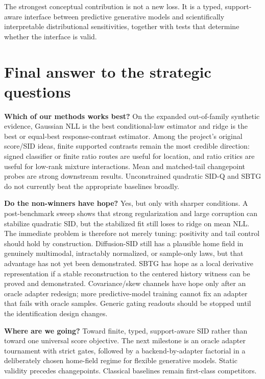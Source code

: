 \documentclass[10pt]{article}
\newcommand{\SIDQ}{\textnormal{\textsc{SID-Q}}\xspace}
\begin{document}
The strongest conceptual contribution is not a new loss. It is a typed, support-aware interface between predictive generative models and scientifically interpretable distributional sensitivities, together with tests that determine whether the interface is valid.



\section{Final answer to the strategic questions}

\textbf{Which of our methods works best?} On the expanded out-of-family synthetic evidence, Gaussian NLL is the best conditional-law estimator and ridge is the best or equal-best response-contrast estimator. Among the project's original score/SID ideas, finite supported contrasts remain the most credible direction: signed classifier or finite ratio routes are useful for location, and ratio critics are useful for low-rank mixture interactions. Mean and matched-tail changepoint probes are strong downstream results. Unconstrained quadratic \SIDQ and SBTG do not currently beat the appropriate baselines broadly.

\textbf{Do the non-winners have hope?} Yes, but only with sharper conditions. A post-benchmark sweep shows that strong regularization and large corruption can stabilize quadratic SID, but the stabilized fit still loses to ridge on mean NLL. The immediate problem is therefore not merely tuning: positivity and tail control should hold by construction. Diffusion-SID still has a plausible home field in genuinely multimodal, intractably normalized, or sample-only laws, but that advantage has not yet been demonstrated. SBTG has hope as a local derivative representation if a stable reconstruction to the centered history witness can be proved and demonstrated. Covariance/skew channels have hope only after an oracle adapter redesign; more predictive-model training cannot fix an adapter that fails with oracle samples. Generic gating readouts should be stopped until the identification design changes.

\textbf{Where are we going?} Toward finite, typed, support-aware SID rather than toward one universal score objective. The next milestone is an oracle adapter tournament with strict gates, followed by a backend-by-adapter factorial in a deliberately chosen home-field regime for flexible generative models. Static validity precedes changepoints. Classical baselines remain first-class competitors.
\end{document}
